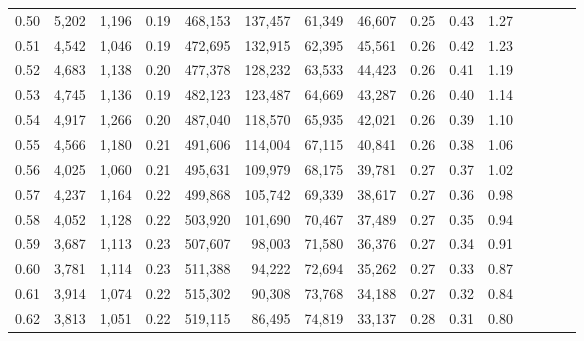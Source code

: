\begin{tabular}{rrrcrrrrrrrrrrr}
0.50 &   5,202 &  1,196 &                                       0.19 &  468,153 &  137,457 &   61,349 &   46,607 &  0.25 &  0.43 &                         1.27 \\
0.51 &   4,542 &  1,046 &                                       0.19 &  472,695 &  132,915 &   62,395 &   45,561 &  0.26 &  0.42 &                         1.23 \\
0.52 &   4,683 &  1,138 &                                       0.20 &  477,378 &  128,232 &   63,533 &   44,423 &  0.26 &  0.41 &                         1.19 \\
0.53 &   4,745 &  1,136 &                                       0.19 &  482,123 &  123,487 &   64,669 &   43,287 &  0.26 &  0.40 &                         1.14 \\
0.54 &   4,917 &  1,266 &                                       0.20 &  487,040 &  118,570 &   65,935 &   42,021 &  0.26 &  0.39 &                         1.10 \\
0.55 &   4,566 &  1,180 &                                       0.21 &  491,606 &  114,004 &   67,115 &   40,841 &  0.26 &  0.38 &                         1.06 \\
0.56 &   4,025 &  1,060 &                                       0.21 &  495,631 &  109,979 &   68,175 &   39,781 &  0.27 &  0.37 &                         1.02 \\
0.57 &   4,237 &  1,164 &                                       0.22 &  499,868 &  105,742 &   69,339 &   38,617 &  0.27 &  0.36 &                         0.98 \\
0.58 &   4,052 &  1,128 &                                       0.22 &  503,920 &  101,690 &   70,467 &   37,489 &  0.27 &  0.35 &                         0.94 \\
0.59 &   3,687 &  1,113 &                                       0.23 &  507,607 &   98,003 &   71,580 &   36,376 &  0.27 &  0.34 &                         0.91 \\
0.60 &   3,781 &  1,114 &                                       0.23 &  511,388 &   94,222 &   72,694 &   35,262 &  0.27 &  0.33 &                         0.87 \\
0.61 &   3,914 &  1,074 &                                       0.22 &  515,302 &   90,308 &   73,768 &   34,188 &  0.27 &  0.32 &                         0.84 \\
0.62 &   3,813 &  1,051 &                                       0.22 &  519,115 &   86,495 &   74,819 &   33,137 &  0.28 &  0.31 &                         0.80 \\

\end{tabular}
